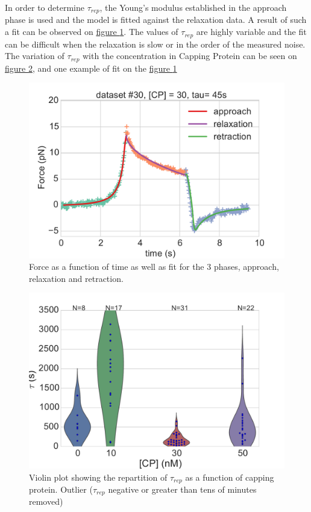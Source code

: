 \documentclass[A4paperpaper,11pt,english]{sphinxmanual}
\begin{document}
In order to determine \(\tau_{rep}\), the Young's modulus established  in the
approach phase is used and the model is fitted against the relaxation data.  A
result of such a fit can be observed on \hyperref[parts/part3:fit-3-phases]{figure  \ref*{parts/part3:fit-3-phases}}. The values of
\(\tau_{rep}\) are highly variable and the fit can be difficult when the relaxation is
slow or in the order of the measured noise. The variation of \(\tau_{rep}\) with the
concentration in Capping Protein can be seen on \hyperref[parts/part3:tau-violin]{figure  \ref*{parts/part3:tau-violin}}, and
one example of fit on the \hyperref[parts/part3:fit-3-phases]{figure  \ref*{parts/part3:fit-3-phases}}
\begin{figure}[htbp]
\centering
\capstart

\includegraphics[width=0.800\linewidth]{3phases.pdf}
\caption{Force as a function of time as well as fit for the 3 phases, approach,
relaxation and retraction.}\label{parts/part3:fit-3-phases}\end{figure}
\begin{figure}[htbp]
\centering
\capstart

\includegraphics[width=0.800\linewidth]{tau_violin.pdf}
\caption{Violin plot showing the repartition of \(\tau_{rep}\) as a function of capping
protein. Outlier (\(\tau_{rep}\) negative or greater than tens of minutes removed)}\label{parts/part3:tau-violin}\end{figure}
\end{document}
